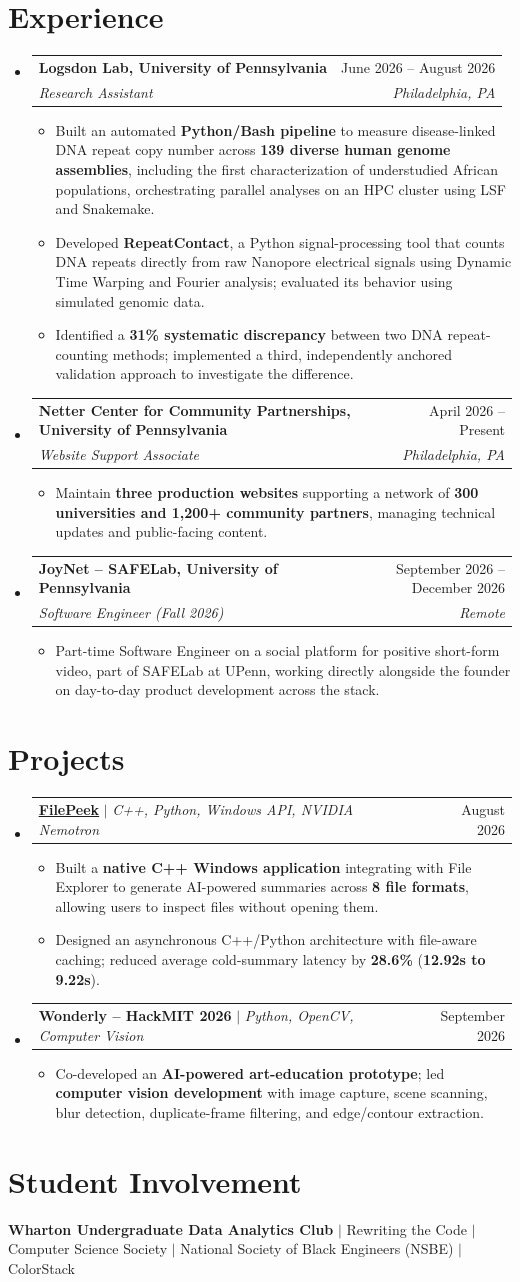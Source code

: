 \documentclass[letterpaper,10pt]{article}
\makeatletter
\newcommand{\resumeItem}[1]{\item \small{#1}}
\newcommand{\resumeSubheading}[4]{
\item \begin{tabularx}{\linewidth}{@{}X r@{}}
\textbf{#1} & \small #2 \\
\textit{\small #3} & \textit{\small #4}
\end{tabularx}\vspace{-2pt}
}
\newcommand{\resumeProject}[3]{
\item \begin{tabularx}{\linewidth}{@{}X r@{}}
\small\textbf{#1} $|$ \small\emph{#2} & \small #3
\end{tabularx}\vspace{-2pt}
}
\newcommand{\resumeSubHeadingListStart}{
\begin{itemize}[
leftmargin=0pt,label={},itemsep=2pt,
topsep=2pt,parsep=0pt,partopsep=0pt
]
}
\newcommand{\resumeSubHeadingListEnd}{
\end{itemize}\vspace{2pt}
}
\newcommand{\resumeItemListStart}{
\begin{itemize}[
leftmargin=0.18in,label=\textbullet,
itemsep=1pt,topsep=1pt,parsep=0pt,partopsep=0pt
]
}
\newcommand{\resumeItemListEnd}{
\end{itemize}\vspace{1pt}
}
\makeatother
\begin{document}
\section{Experience}
\resumeSubHeadingListStart
\resumeSubheading
{Logsdon Lab, University of Pennsylvania}
{June 2026 -- August 2026}
{Research Assistant}
{Philadelphia, PA}
\resumeItemListStart
\resumeItem{
Built an automated \textbf{Python/Bash pipeline} to measure disease-linked DNA repeat copy number across \textbf{139 diverse human genome assemblies}, including the first characterization of understudied African populations, orchestrating parallel analyses on an HPC cluster using LSF and Snakemake.
}
\resumeItem{
Developed \textbf{RepeatContact}, a Python signal-processing tool that counts DNA repeats directly from raw Nanopore electrical signals using Dynamic Time Warping and Fourier analysis; evaluated its behavior using simulated genomic data.
}
\resumeItem{
Identified a \textbf{31\% systematic discrepancy} between two DNA repeat-counting methods; implemented a third, independently anchored validation approach to investigate the difference.
}
\resumeItemListEnd
\resumeSubheading
{Netter Center for Community Partnerships, University of Pennsylvania}
{April 2026 -- Present}
{Website Support Associate}
{Philadelphia, PA}
\resumeItemListStart
\resumeItem{
Maintain \textbf{three production websites} supporting a network of \textbf{300 universities and 1,200+ community partners}, managing technical updates and public-facing content.
}
\resumeItemListEnd
\resumeSubheading
{JoyNet -- SAFELab, University of Pennsylvania}
{September 2026 -- December 2026}
{Software Engineer (Fall 2026)}
{Remote}
\resumeItemListStart
\resumeItem{
Part-time Software Engineer on a social platform for positive short-form video, part of SAFELab at UPenn, working directly alongside the founder on day-to-day product development across the stack.
}
\resumeItemListEnd
\resumeSubHeadingListEnd
\section{Projects}
\resumeSubHeadingListStart
\resumeProject
{\href{https://waguea.github.io/File-Peek/}
{\underline{FilePeek}}}
{C++, Python, Windows API, NVIDIA Nemotron}
{August 2026}
\resumeItemListStart
\resumeItem{
Built a \textbf{native C++ Windows application} integrating with File Explorer to generate AI-powered summaries across \textbf{8 file formats}, allowing users to inspect files without opening them.
}
\resumeItem{
Designed an asynchronous C++/Python architecture with file-aware caching; reduced average cold-summary latency by \textbf{28.6\%} (\textbf{12.92s to 9.22s}).
}
\resumeItemListEnd
\resumeProject
{Wonderly -- HackMIT 2026}
{Python, OpenCV, Computer Vision}
{September 2026}
\resumeItemListStart
\resumeItem{
Co-developed an \textbf{AI-powered art-education prototype}; led \textbf{computer vision development} with image capture, scene scanning, blur detection, duplicate-frame filtering, and edge/contour extraction.
}
\resumeItemListEnd
\resumeSubHeadingListEnd
\section{Student Involvement}
{\small
\textbf{Wharton Undergraduate Data Analytics Club} $|$ Rewriting the Code $|$ Computer Science Society $|$ National Society of Black Engineers (NSBE) $|$ ColorStack
}
\end{document}
